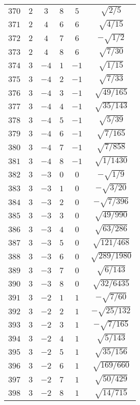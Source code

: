 \begin{table}
\begin{center}
\begin{tabular}{|c|c|c|c|c|c|}
$370$ & $2$ & $3$ & $8$ & $5$ & $\sqrt{2/5}$ \\ 
$371$ & $2$ & $4$ & $6$ & $6$ & $\sqrt{4/15}$ \\ 
$372$ & $2$ & $4$ & $7$ & $6$ & $-\sqrt{1/2}$ \\ 
$373$ & $2$ & $4$ & $8$ & $6$ & $\sqrt{7/30}$ \\ 
$374$ & $3$ & $-4$ & $1$ & $-1$ & $\sqrt{1/15}$ \\ 
$375$ & $3$ & $-4$ & $2$ & $-1$ & $\sqrt{7/33}$ \\ 
$376$ & $3$ & $-4$ & $3$ & $-1$ & $\sqrt{49/165}$ \\ 
$377$ & $3$ & $-4$ & $4$ & $-1$ & $\sqrt{35/143}$ \\ 
$378$ & $3$ & $-4$ & $5$ & $-1$ & $\sqrt{5/39}$ \\ 
$379$ & $3$ & $-4$ & $6$ & $-1$ & $\sqrt{7/165}$ \\ 
$380$ & $3$ & $-4$ & $7$ & $-1$ & $\sqrt{7/858}$ \\ 
$381$ & $3$ & $-4$ & $8$ & $-1$ & $\sqrt{1/1430}$ \\ 
$382$ & $3$ & $-3$ & $0$ & $0$ & $-\sqrt{1/9}$ \\ 
$383$ & $3$ & $-3$ & $1$ & $0$ & $-\sqrt{3/20}$ \\ 
$384$ & $3$ & $-3$ & $2$ & $0$ & $-\sqrt{7/396}$ \\ 
$385$ & $3$ & $-3$ & $3$ & $0$ & $\sqrt{49/990}$ \\ 
$386$ & $3$ & $-3$ & $4$ & $0$ & $\sqrt{63/286}$ \\ 
$387$ & $3$ & $-3$ & $5$ & $0$ & $\sqrt{121/468}$ \\ 
$388$ & $3$ & $-3$ & $6$ & $0$ & $\sqrt{289/1980}$ \\ 
$389$ & $3$ & $-3$ & $7$ & $0$ & $\sqrt{6/143}$ \\ 
$390$ & $3$ & $-3$ & $8$ & $0$ & $\sqrt{32/6435}$ \\ 
$391$ & $3$ & $-2$ & $1$ & $1$ & $-\sqrt{7/60}$ \\ 
$392$ & $3$ & $-2$ & $2$ & $1$ & $-\sqrt{25/132}$ \\ 
$393$ & $3$ & $-2$ & $3$ & $1$ & $-\sqrt{7/165}$ \\ 
$394$ & $3$ & $-2$ & $4$ & $1$ & $\sqrt{5/143}$ \\ 
$395$ & $3$ & $-2$ & $5$ & $1$ & $\sqrt{35/156}$ \\ 
$396$ & $3$ & $-2$ & $6$ & $1$ & $\sqrt{169/660}$ \\ 
$397$ & $3$ & $-2$ & $7$ & $1$ & $\sqrt{50/429}$ \\ 
$398$ & $3$ & $-2$ & $8$ & $1$ & $\sqrt{14/715}$ \\ 

\end{tabular}
\end{center}
\end{table}

